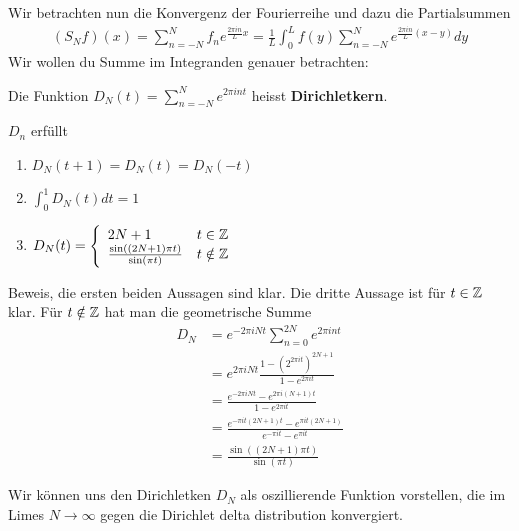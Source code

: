 Wir betrachten nun die Konvergenz der Fourierreihe und dazu die Partialsummen
\begin{align*}
	(S_Nf)(x) = \sum_{n = -N}^{N}f_n e^{\frac{2\pi in}{L}x} = \frac{1}{L} \int_{0}^{L}f(y) \sum_{n = -N}^{N}e^{\frac{2\pi in}{L}(x-y)}dy
\end{align*}
Wir wollen du Summe im Integranden genauer betrachten:
\begin{definition}[Dirichletkern]
	Die Funktion $D_N(t) = \sum_{n = -N}^{N}e^{2\pi i n t}$ heisst \textbf{Dirichletkern}.
\end{definition}

\begin{lemma}[]
$D_n$ erfüllt
\begin{enumerate}
	\item $D_N(t + 1) = D_N(t) = D_N(-t)$
	\item $\int_{0}^{1}D_N(t) dt = 1$
	\item $D_N(t) = \left\{\begin{array}{ll}
		2N + 1 & t \in \mathbb{Z} \\
		\frac{\sin \left((2N + 1)\pi t\right)}{\sin(\pi t)} & t \notin \mathbb{Z}
	\end{array} \right.$
\end{enumerate}
\end{lemma}

Beweis, die ersten beiden Aussagen sind klar. Die dritte Aussage ist für $t \in \mathbb{Z}$ klar. Für $t \notin \mathbb{Z}$ hat man die geometrische Summe
\begin{align*}
	D_N &= e^{- 2\pi i N t}\sum_{n = 0}^{2N} e^{2\pi i n t}\\
			&=e^{2\pi i Nt} \frac{1 - \left(2^{2\pi i t}\right)^{2N + 1}}{1 - e^{2\pi i t}}\\
			&= \frac{e^{-2\pi iNt} - e^{2\pi i(N+1)t}}{1 - e^{2\pi i t}}\\
			&= \frac{e^{-\pi i t(2N+1)t} - e^{\pi i t(2N + 1)}}{e^{-\pi it}- e^{\pi it}}\\
			&= \frac{\sin((2N + 1)\pi t)}{\sin(\pi t)}
\end{align*}

Wir können uns den Dirichletken $D_N$ als oszillierende Funktion vorstellen, die im Limes $N \to  \infty$ gegen die Dirichlet delta distribution konvergiert.\\


